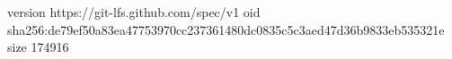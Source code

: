 version https://git-lfs.github.com/spec/v1
oid sha256:de79ef50a83ea47753970cc237361480dc0835c5c3aed47d36b9833eb535321e
size 174916
